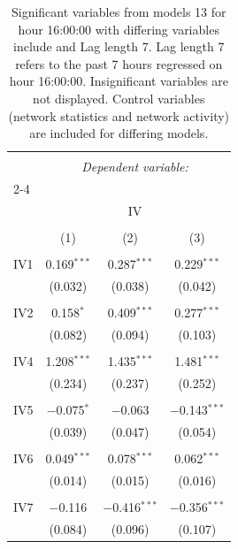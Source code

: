
\begin{table}[!htbp] \centering 
  \caption{Significant variables from models 13 for hour 16:00:00 with differing variables include 
                               and Lag length 7. Lag length 7 refers to the past 7 hours regressed on hour 16:00:00. 
                               Insignificant variables are not displayed. 
                               Control variables (network statistics and network activity) are 
                               included for differing models.} 
  \label{IVmodels2_t_hourlagged3} 
\scriptsize 
\begin{tabular}{@{\extracolsep{5pt}}lccc} 
\\[-1.8ex]\hline 
\hline \\[-1.8ex] 
 & \multicolumn{3}{c}{\textit{Dependent variable:}} \\ 
\cline{2-4} 
\\[-1.8ex] & \multicolumn{3}{c}{IV} \\ 
\\[-1.8ex] & (1) & (2) & (3)\\ 
\hline \\[-1.8ex] 
 IV1 & 0.169$^{***}$ & 0.287$^{***}$ & 0.229$^{***}$ \\ 
  & (0.032) & (0.038) & (0.042) \\ 
  & & & \\ 
 IV2 & 0.158$^{*}$ & 0.409$^{***}$ & 0.277$^{***}$ \\ 
  & (0.082) & (0.094) & (0.103) \\ 
  & & & \\ 
 IV4 & 1.208$^{***}$ & 1.435$^{***}$ & 1.481$^{***}$ \\ 
  & (0.234) & (0.237) & (0.252) \\ 
  & & & \\ 
 IV5 & $-$0.075$^{*}$ & $-$0.063 & $-$0.143$^{***}$ \\ 
  & (0.039) & (0.047) & (0.054) \\ 
  & & & \\ 
 IV6 & 0.049$^{***}$ & 0.078$^{***}$ & 0.062$^{***}$ \\ 
  & (0.014) & (0.015) & (0.016) \\ 
  & & & \\ 
 IV7 & $-$0.116 & $-$0.416$^{***}$ & $-$0.356$^{***}$ \\ 
  & (0.084) & (0.096) & (0.107) \\ 

\end{tabular}
\end{table}
